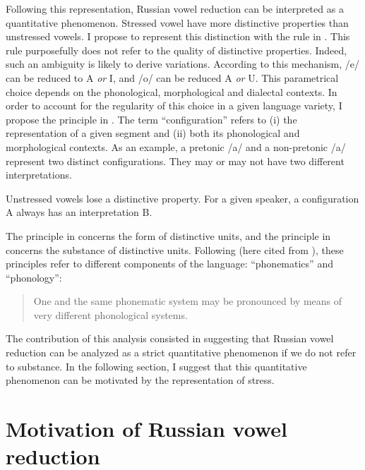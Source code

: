 \documentclass[output=paper,modfonts,newtxmath,hidelinks,]{langscibook}
\begin{document}
\noindent Following this representation, Russian vowel reduction can be interpreted as a quantitative phenomenon. Stressed vowel have more distinctive properties than unstressed vowels. I propose to represent this distinction with the rule in . This rule purposefully does not refer to the quality of distinctive properties. Indeed, such an ambiguity is likely to derive variations. According to this mechanism, /e/ can be reduced to {\textbar}A{\textbar} \textit{or} {\textbar}I{\textbar}, and /o/ can be reduced {\textbar}A{\textbar} \textit{or} {\textbar}U{\textbar}. This parametrical choice depends on the phonological, morphological and dialectal contexts. In order to account for the regularity of this choice in a given language variety, I propose the principle in . The term “configuration” refers to (i) the representation of a given segment and (ii) both its phonological and morphological contexts. As an example, a pretonic /a/ and a non-pretonic /a/ represent two distinct configurations. They may or may not have two different interpretations.

\label{5:21}
\ea Unstressed vowels lose a distinctive property.\label{5:21a}
\ex For a given speaker, a configuration A always has an interpretation B.\label{5:21b}
\z\z

\noindent The principle in  concerns the form of distinctive units, and the principle in  concerns the substance of distinctive units. Following \citet{Hjelmslev1936} (here cited from \citealt{Hjelmslev1973}), these principles refer to different components of the language: “phonematics” and “phonology”:

\begin{quotation}
One and the same phonematic system may be pronounced by means of very different phonological systems. \citep[159]{Hjelmslev1973}
\end{quotation}

The contribution of this analysis consisted in suggesting that Russian vowel reduction can be analyzed as a strict quantitative phenomenon if we do not refer to substance. In the following section, I suggest that this quantitative phenomenon can be motivated by the representation of stress.

\section{Motivation of Russian vowel reduction}\label{5:s4}
\end{document}
